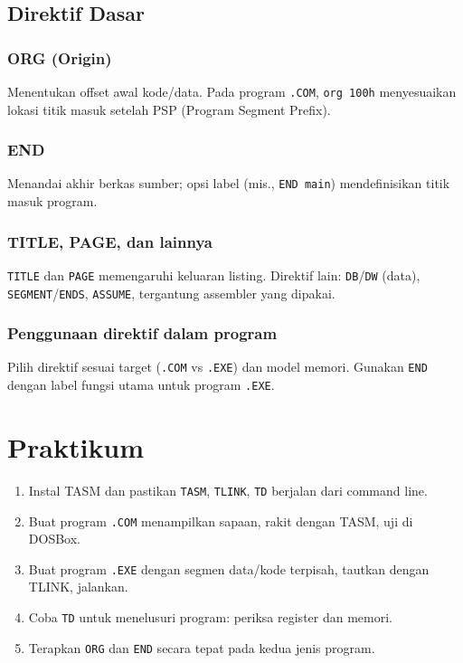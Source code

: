\subsection{Direktif Dasar}
\subsubsection{ORG (Origin)}
Menentukan offset awal kode/data. Pada program \texttt{.COM}, \texttt{org 100h} menyesuaikan lokasi titik masuk setelah PSP (Program Segment Prefix).

\subsubsection{END}
Menandai akhir berkas sumber; opsi label (mis., \texttt{END main}) mendefinisikan titik masuk program.

\subsubsection{TITLE, PAGE, dan lainnya}
\texttt{TITLE} dan \texttt{PAGE} memengaruhi keluaran listing. Direktif lain: \texttt{DB}/\texttt{DW} (data), \texttt{SEGMENT}/\texttt{ENDS}, \texttt{ASSUME}, tergantung assembler yang dipakai.

\subsubsection{Penggunaan direktif dalam program}
Pilih direktif sesuai target (\texttt{.COM} vs \texttt{.EXE}) dan model memori. Gunakan \texttt{END} dengan label fungsi utama untuk program \texttt{.EXE}.

\section{Praktikum}
\begin{enumerate}
  \item Instal TASM dan pastikan \texttt{TASM}, \texttt{TLINK}, \texttt{TD} berjalan dari command line.
  \item Buat program \texttt{.COM} menampilkan sapaan, rakit dengan TASM, uji di DOSBox.
  \item Buat program \texttt{.EXE} dengan segmen data/kode terpisah, tautkan dengan TLINK, jalankan.
  \item Coba \texttt{TD} untuk menelusuri program: periksa register dan memori.
  \item Terapkan \texttt{ORG} dan \texttt{END} secara tepat pada kedua jenis program.
\end{enumerate}

